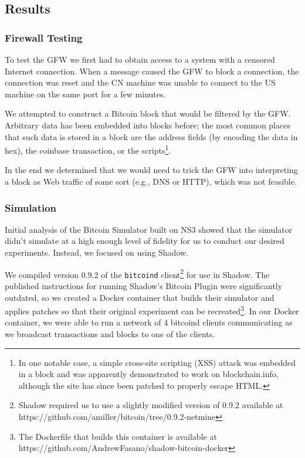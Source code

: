 \subsection{Results}

\subsubsection{Firewall Testing}
To test the GFW we first had to obtain access to a system with a censored Internet connection. When a message caused the GFW to block a connection, the connection was reset and the CN machine was unable to connect to the US machine on the same port for a few minutes.

We attempted to construct a Bitcoin block that would be filtered by the GFW. Arbitrary data has been embedded into blocks before; the most common places that such data is stored in a block are the address fields (by encoding the data in hex), the coinbase transaction, or the scripts\footnote{In one notable case, a simple cross-site scripting (XSS) attack was embedded in a block and was apparently demonstrated to work on blockchain.info\cite{reddit}, although the site has since been patched to properly escape HTML.}. 

In the end we determined that we would need to trick the GFW into interpreting a block as Web traffic of some sort (e.g., DNS or HTTP), which was not feasible.

\subsubsection{Simulation}
Initial analysis of the Bitcoin Simulator built on NS3 showed that the simulator didn't simulate at a high enough level of fidelity for us to conduct our desired experiments. Instead, we focused on using Shadow.

We compiled version 0.9.2 of the \texttt{bitcoind} client\footnote{Shadow required us to use a slightly modified version of 0.9.2 available at https://github.com/amiller/bitcoin/tree/0.9.2-netmine} for use in Shadow. The published instructions for running Shadow's Bitcoin Plugin were significantly outdated, so we created a Docker container that builds their simulator and applies patches so that their original experiment can be recreated\footnote{The Dockerfile that builds this container is available at https://github.com/AndrewFasano/shadow-bitcoin-docker}. In our Docker container, we were able to run a network of 4 bitcoind clients communicating as we broadcast transactions and blocks to one of the clients.

